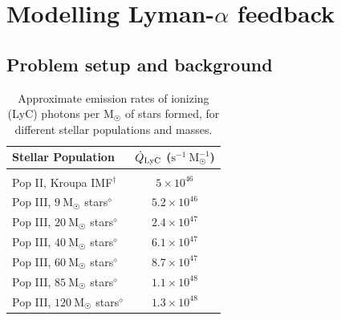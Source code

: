 \documentclass[fleqn,usenatbib]{mnras}
\newcommand\Msun{\text{M}_{\astrosun}} %
\begin{document}
\section{Modelling Lyman-\texorpdfstring{\boldmath$\alpha$}{alpha} feedback}
\subsection{Problem setup and background}
\label{Problem setup and background}

\begin{table}
\caption{Approximate emission rates of ionizing (LyC) photons per $\Msun$ of stars formed, for different stellar populations and masses.}
\begin{tabular}{l c}
\hline
\hline
Stellar Population & $\Dot{Q}_{\rm LyC}$ ($\textrm{s}^{-1} ~ \Msun^{-1}$)  \\

\hline
\hline

\\
\vspace{8 pt}

Pop II, Kroupa IMF$^\dagger$ & $5 \times 10^{46}$  \\

\vspace{8 pt}

Pop III, $9 ~ \Msun$ stars$^{\diamond}$ & $5.2 \times 10^{46}$  \\

\vspace{8 pt}

Pop III, $20 ~ \Msun$ stars$^{\diamond}$ & $2.4 \times 10^{47}$   \\

\vspace{8 pt}

Pop III, $40 ~ \Msun$ stars$^{\diamond}$ & $6.1 \times 10^{47}$  \\

\vspace{8 pt}

Pop III, $60 ~ \Msun$ stars$^{\diamond}$ & $8.7 \times 10^{47}$   \\

\vspace{8 pt}

Pop III, $85 ~ \Msun$ stars$^{\diamond}$ & $1.1 \times 10^{48}$  \\

\vspace{8 pt}

Pop III, $120 ~ \Msun$ stars$^{\diamond}$ & $1.3 \times 10^{48}$  


\end{tabular}
\end{table}
\end{document}
